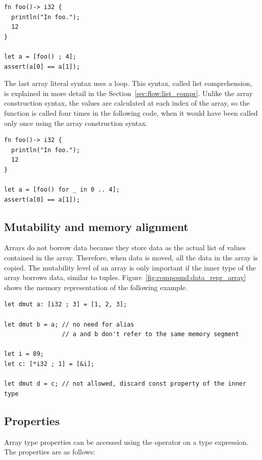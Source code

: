 \begin{lstlisting}[style=coloredverbatim]
fn foo()-> i32 {
  println("In foo.");
  12
}

let a = [foo() ; 4];
assert(a[0] == a[1]);
\end{lstlisting}

\smallskip
The last array literal syntax uses a  loop. This syntax, called list
comprehension, is explained in more detail in the Section~\ref{sec:flow:list_compr}.
Unlike the array construction syntax, the values are calculated at each index of
the array, so the function is called four times in the following code, when it
would have been called only once using the array construction syntax.

\begin{lstlisting}[style=coloredverbatim]
fn foo()-> i32 {
  println("In foo.");
  12
}

let a = [foo() for _ in 0 .. 4];
assert(a[0] == a[1]);
\end{lstlisting}


\subsection{Mutability and memory alignment}
Arrays do not borrow data because they store data as the actual list of values
contained in the array. Therefore, when data is moved, all the data in the array
is copied. The mutability level of an array is only important if the inner type
of the array borrows data, similar to tuples. Figure~\ref{fig:compound:data_repr_array}
shows the memory representation of the following example.

\begin{lstlisting}[style=coloredverbatimError]
let dmut a: [i32 ; 3] = [1, 2, 3];

let dmut b = a; // no need for alias
                // a and b don't refer to the same memory segment

let i = 89;
let c: [*i32 ; 1] = [&i];

let dmut d = c; // not allowed, discard const property of the inner type
\end{lstlisting}



\subsection{Properties}

Array type properties can be accessed using the \token{::} operator on a type
expression. The properties are as follows:

